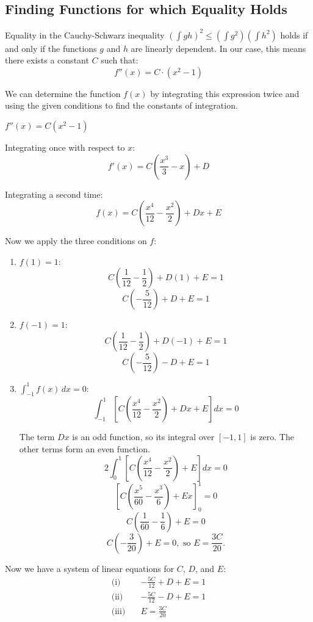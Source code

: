 \documentclass[12pt,a4paper]{article}
\theoremstyle{definition}
\begin{document}
\subsection*{Finding Functions for which Equality Holds}

Equality in the Cauchy-Schwarz inequality $(\int gh)^2 \leq (\int g^2)(\int h^2)$ holds if and only if the functions $g$ and $h$ are linearly dependent. In our case, this means there exists a constant $C$ such that:
\[
f''(x) = C \cdot (x^2 - 1)
\]

We can determine the function $f(x)$ by integrating this expression twice and using the given conditions to find the constants of integration.

$f''(x) = C(x^2 - 1)$

Integrating once with respect to $x$:
\[
f'(x) = C\left(\frac{x^3}{3} - x\right) + D
\]

Integrating a second time:
\[
f(x) = C\left(\frac{x^4}{12} - \frac{x^2}{2}\right) + Dx + E
\]

Now we apply the three conditions on $f$:

\begin{enumerate}
\item $f(1) = 1$:
\[
C\left(\frac{1}{12} - \frac{1}{2}\right) + D(1) + E = 1
\]
\[
C\left(-\frac{5}{12}\right) + D + E = 1
\]

\item $f(-1) = 1$:
\[
C\left(\frac{1}{12} - \frac{1}{2}\right) + D(-1) + E = 1
\]
\[
C\left(-\frac{5}{12}\right) - D + E = 1
\]

\item $\int_{-1}^{1} f(x) \, dx = 0$:
\[
\int_{-1}^{1} \left[C\left(\frac{x^4}{12} - \frac{x^2}{2}\right) + Dx + E\right] dx = 0
\]

The term $Dx$ is an odd function, so its integral over $[-1, 1]$ is zero. The other terms form an even function.
\[
2 \int_{0}^{1} \left[C\left(\frac{x^4}{12} - \frac{x^2}{2}\right) + E\right] dx = 0
\]
\[
\left[C\left(\frac{x^5}{60} - \frac{x^3}{6}\right) + Ex\right]_{0}^{1} = 0
\]
\[
C\left(\frac{1}{60} - \frac{1}{6}\right) + E = 0
\]
\[
C\left(-\frac{3}{20}\right) + E = 0, \text{ so } E = \frac{3C}{20}.
\]
\end{enumerate}

Now we have a system of linear equations for $C$, $D$, and $E$:
\begin{align}
\text{(i)} \quad &-\frac{5C}{12} + D + E = 1 \\
\text{(ii)} \quad &-\frac{5C}{12} - D + E = 1 \\
\text{(iii)} \quad &E = \frac{3C}{20}
\end{align}
\end{document}
